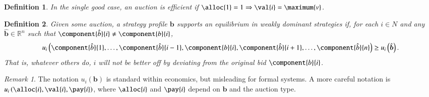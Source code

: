 \documentclass[12pt,a4paper]{scrartcl}
\newtheorem{definition}{Definition}
\theoremstyle{remark} %
\newtheorem{remark}{Remark}
\begin{document}
\begin{module}[id=auction-properties]
  \begin{definition} \label{def:eff}
    In the single good case, an auction is \emph{efficient} if $\alloc{1} = 1 \Rightarrow \val{i} = \maximum{v}$.
  \end{definition}

  \begin{definition} \label{def:WDS}
    Given some auction, a strategy profile $\bm{b}$ supports an \emph{equilibrium in weakly dominant strategies} if, for each $i \in N$ and any $\hat{\bm{b}} \in \mathbb{R}^n$ such that $\component{\hat{b}}{i} \ne \component{b}{i}$,
    \begin{equation} \label{in:WDS}
      u_i \left( \component{\hat{b}}{1}, \ldots, \component{\hat{b}}{{i-1}}, \component{b}{i}, \component{\hat{b}}{i+1}, \ldots, \component{\hat{b}}{n} \right) \ge u_i \left( \hat{\bm{b}} \right).
    \end{equation}
    That is, whatever others do, $i$ will not be better off by deviating from the original bid $\component{b}{i}$.

  \end{definition}

  \begin{remark}
    The notation $u_i \left( \bm{b} \right)$ is standard within economics, but misleading for formal systems.  A more careful notation is $u_i \left( \alloc{i}, \val{i}, \pay{i} \right)$, where $\alloc{i}$ and $\pay{i}$ depend on $\bm{b}$ and the auction type.
  \end{remark}
\end{module}
\end{document}
